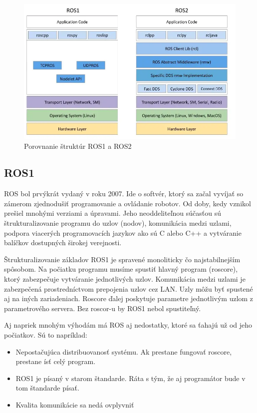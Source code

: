 \begin{figure}[!htbp]
	\centering
	\includegraphics[width=15cm]{img/strukturaRos1Ros2.png}
    \caption{Porovnanie štruktúr ROS1 a ROS2 \cite{comparison}}
	\label{struktury}
\end{figure}

\subsection{ROS1}

\noindent ROS bol prvýkrát vydaný v roku 2007. Ide o softvér, ktorý sa začal vyvíjať so zámerom zjednodušiť programovanie a ovládanie robotov. Od doby,
kedy vznikol prešiel mnohými verziami a úpravami. Jeho neoddeliteľnou súčasťou sú štrukturalizovanie programu do uzlov (nodov), komunikácia medzi uzlami,
podpora viacerých programovacích jazykov ako sú C alebo C++ a vytváranie balíčkov dostupných širokej verejnosti.

Štrukturalizovanie základov ROS1 je spravené monoliticky čo najstabilnejším spôsobom. Na počiatku programu musíme spustiť hlavný program (roscore),
ktorý zabezpečuje vytváranie jednotlivých uzlov. Komunikácia medzi uzlami je zabezpečená prostredníctvom prepojenia uzlov cez LAN. Uzly môžu byť
spustené aj na iných zariadeniach. Roscore ďalej poskytuje parametre jednotlivým uzlom z parametrového servera. Bez roscor-u by ROS1 nebol spustiteľný.

Aj napriek mnohým výhodám má ROS aj nedostatky, ktoré sa ťahajú už od jeho počiatkov. Sú to napríklad:
\begin{itemize}
 \item Nepostačujúca distribuovanosť systému. Ak prestane fungovať roscore, prestane ísť celý program.
 \item ROS1 je písaný v starom štandarde. Ráta s tým, že aj programátor bude v tom štandarde písať.
 \item Kvalita komunikácie sa nedá ovplyvniť
\end{itemize}

